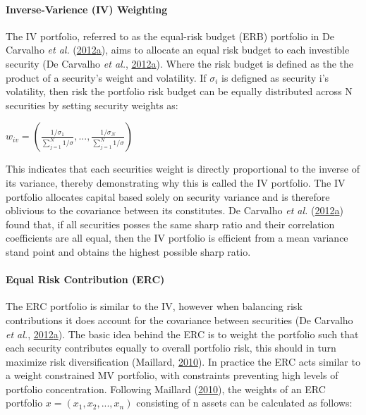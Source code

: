 \documentclass[11pt,preprint, authoryear]{elsarticle}
\numberwithin{equation}{section}
\numberwithin{figure}{section}
\numberwithin{table}{section}
\begin{document}
\hypertarget{inverse-varience-iv-weighting}{%
\paragraph{Inverse-Varience (IV)
Weighting}\label{inverse-varience-iv-weighting}}

The IV portfolio, referred to as the equal-risk budget (ERB) portfolio
in De Carvalho \emph{et al.}
(\protect\hyperlink{ref-leote}{2012}\protect\hyperlink{ref-leote}{a}),
aims to allocate an equal risk budget to each investible security (De
Carvalho \emph{et al.},
\protect\hyperlink{ref-leote}{2012}\protect\hyperlink{ref-leote}{a}).
Where the risk budget is defined as the the product of a security's
weight and volatility. If \(\sigma_i\) is defigned as security i's
volatility, then risk the portfolio risk budget can be equally
distributed across N securities by setting security weights as:

\begin{center} 
$w_{iv}=(\frac{1/\sigma_1}{\sum^N_{j=1} 1/\sigma}, ...,\frac{1/\sigma_N}{\sum^N_{j=1} 1/\sigma} )$ 
\end{center}

This indicates that each securities weight is directly proportional to
the inverse of its variance, thereby demonstrating why this is called
the IV portfolio. The IV portfolio allocates capital based solely on
security variance and is therefore oblivious to the covariance between
its constitutes. De Carvalho \emph{et al.}
(\protect\hyperlink{ref-leote}{2012}\protect\hyperlink{ref-leote}{a})
found that, if all securities posses the same sharp ratio and their
correlation coefficients are all equal, then the IV portfolio is
efficient from a mean variance stand point and obtains the highest
possible sharp ratio.

\hypertarget{equal-risk-contribution-erc}{%
\paragraph{Equal Risk Contribution
(ERC)}\label{equal-risk-contribution-erc}}

The ERC portfolio is similar to the IV, however when balancing risk
contributions it does account for the covariance between securities (De
Carvalho \emph{et al.},
\protect\hyperlink{ref-leote}{2012}\protect\hyperlink{ref-leote}{a}).
The basic idea behind the ERC is to weight the portfolio such that each
security contributes equally to overall portfolio risk, this should in
turn maximize risk diversification (Maillard,
\protect\hyperlink{ref-maillard2010}{2010}). In practice the ERC acts
similar to a weight constrained MV portfolio, with constraints
preventing high levels of portfolio concentration. Following Maillard
(\protect\hyperlink{ref-maillard2010}{2010}), the weights of an ERC
portfolio \(x=(x_1,x_2,...,x_n)\) consisting of n assets can be
calculated as follows:
\end{document}
